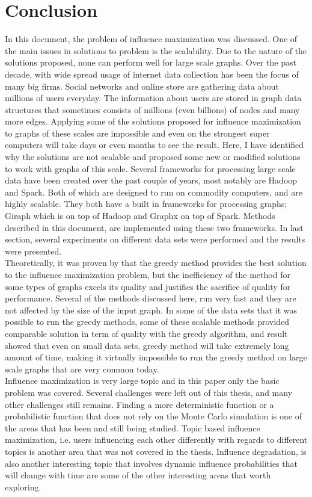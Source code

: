 \documentclass[english]{tktltiki}
\begin{document}
\section{Conclusion}
In this document, the problem of influence maximization was discussed. One of the main issues in solutions to problem is the scalability. Due to the nature of the solutions proposed, none can perform well for large scale graphs. Over the past decade, with wide spread usage of internet data collection has been the focus of many big firms. Social networks and online store are gathering data about millions of users everyday. The information about users are stored in graph data structures that sometimes consists of millions (even billions) of nodes and  many more edges. Applying some of the solutions proposed for influence maximization to graphs of these scales are impossible and even on the strongest super computers will take days or even months to see the result. Here, I have identified why the solutions are not scalable and proposed some new or modified solutions to work with graphs of this scale. Several frameworks for processing large scale data have been created over the past couple of years, most notably are Hadoop and Spark. Both of which are designed to run on commodity computers, and are highly scalable. They both have a built in frameworks for processing graphs; Giraph which is on top of Hadoop and Graphx on top of Spark. Methods described in this document, are implemented using these two frameworks. In last section, several experiments on different data sets were performed and the results were presented. \\
Theoretically, it was proven by \cite{kempe03} that the greedy method provides the best solution to the influence maximization problem, but the inefficiency of the method for some types of graphs excels its quality and justifies the sacrifice of quality for performance. Several of the methods discussed here, run very fast and they are not affected by the size of the input graph. In some of the data sets that it was possible to run the greedy methods, some of these scalable methods provided comparable solution in term of quality with the greedy algorithm, and result showed that even on small data sets, greedy method will take extremely long amount of time, making it virtually impossible to run the greedy method on large scale graphs that are very common today. \\
Influence maximization is very large topic and in this paper only the basic problem was covered. Several challenges were left out of this thesis, and many other challenges still remains. Finding a more deterministic function or a probabilistic function that does not rely on the Monte Carlo simulation is one of the areas that has been and still being studied. Topic based influence maximization, i.e. users influencing each other differently with regards to different topics is another area that was not covered in the thesis. Influence degradation, is also another interesting topic that involves dynamic influence probabilities that will change with time are some of the other interesting areas that worth exploring.

\pagebreak





\lastpage
\appendices
\pagestyle{empty}
\end{document}
